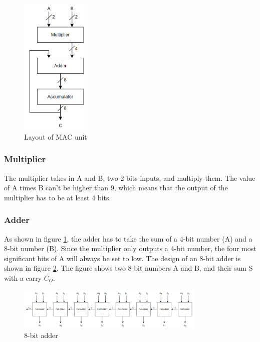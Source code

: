 \begin{figure}[htpb]
    \centering
    \includegraphics[width=0.3\textwidth]{Figures/mac-blokk.png}
    \caption{Layout of MAC unit}
    \label{fig:mac-blokk}
\end{figure}

\subsubsection{Multiplier}
The multiplier takes in A and B, two 2 bits inputs, and multiply them. The value of A times B can't be higher than 9, which means that the output of the multiplier has to be at least 4 bits. 

\subsubsection{Adder}
As shown in figure \ref{fig:mac-blokk}, the adder has to take the sum of a 4-bit number (A) and a 8-bit number (B). Since the multiplier only outputs a 4-bit number, the four most significant bits of A will always be set to low. The design of an 8-bit adder is shown in figure \ref{fig:adder-blokk}. The figure shows two 8-bit numbers A and B, and their sum S with a carry $C_O$. 

\begin{figure}[H]
    \centering
    \includegraphics[width=0.8\textwidth]{Figures/8bitadder.png}
    \caption{8-bit adder}
    \label{fig:adder-blokk}
\end{figure}


